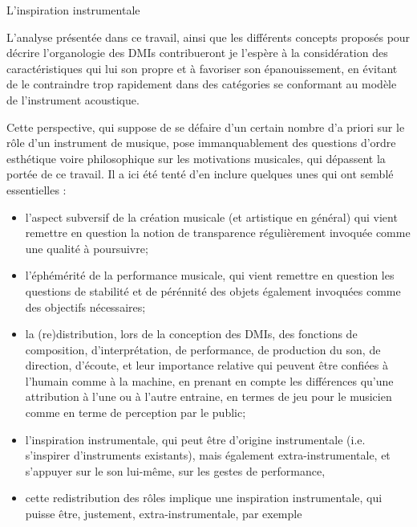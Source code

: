 L'inspiration instrumentale

L'analyse présentée dans ce travail, ainsi que les différents concepts proposés pour décrire l'organologie des \glspl{DMI} contribueront je l'espère à la considération des caractéristiques qui lui son propre et à favoriser son épanouissement, en évitant de le contraindre trop rapidement dans des catégories se conformant au modèle de l'instrument acoustique. 

Cette perspective, qui suppose de se défaire d'un certain nombre d'a priori sur le rôle d'un instrument de musique, pose immanquablement des questions d'ordre esthétique voire philosophique sur les motivations musicales, qui dépassent la portée de ce travail. Il a ici été tenté d'en inclure quelques unes qui ont semblé essentielles : 
\begin{itemize}[noitemsep]
	\item l'aspect subversif de la création musicale (et artistique en général) qui vient remettre en question la notion de transparence régulièrement invoquée comme une qualité à poursuivre;
	\item l'éphémérité de la performance musicale, qui vient remettre en question les questions de stabilité et de pérénnité des objets également invoquées comme des objectifs nécessaires;
	\item la (re)distribution, lors de la conception des \glspl{DMI}, des fonctions de composition, d'interprétation, de performance, de production du son, de direction, d'écoute, et leur importance relative qui peuvent être confiées à l'humain comme à la machine, en prenant en compte les différences qu'une attribution à l'une ou à l'autre entraine, en termes de jeu pour le musicien comme en terme de perception par le public;
	\item l'inspiration instrumentale, qui peut être d'origine instrumentale (i.e. s'inspirer d'instruments existants), mais également extra-instrumentale, et s'appuyer sur le son lui-même, sur les gestes de performance,
	\item cette redistribution des rôles implique une inspiration instrumentale, qui puisse être, justement, extra-instrumentale, par exemple
\end{itemize}